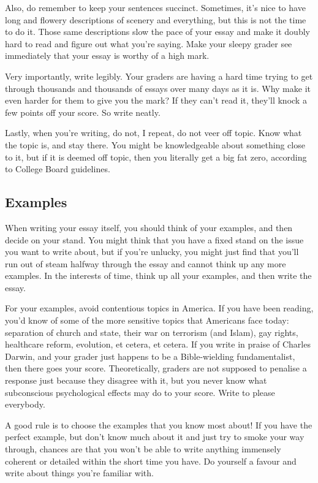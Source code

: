Also, do remember to keep your sentences succinct. Sometimes, it's nice to have long and flowery descriptions of scenery and everything, but this is not the time to do it. Those same descriptions slow the pace of your essay and make it doubly hard to read and figure out what you're saying. Make your sleepy grader see immediately that your essay is worthy of a high mark.

Very importantly, write legibly. Your graders are having a hard time trying to get through thousands and thousands of essays over many days as it is. Why make it even harder for them to give you the mark? If they can't read it, they'll knock a few points off your score. So write neatly.

Lastly, when you're writing, do not, I repeat, do not veer off topic. Know what the topic is, and stay there. You might be knowledgeable about something close to it, but if it is deemed off topic, then you literally get a big fat zero, according to College Board guidelines.
\subsection{Examples}
When writing your essay itself, you should think of your examples, and then decide on your stand. You might think that you have a fixed stand on the issue you want to write about, but if you're unlucky, you might just find that you'll run out of steam halfway through the essay and cannot think up any more examples. In the interests of time, think up all your examples, and then write the essay.

For your examples, avoid contentious topics in America. If you have been reading, you'd know of some of the more sensitive topics that Americans face today: separation of church and state, their war on terrorism (and Islam), gay rights, healthcare reform, evolution, et cetera, et cetera. If you write in praise of Charles Darwin, and your grader just happens to be a Bible-wielding fundamentalist, then there goes your score. Theoretically, graders are not supposed to penalise a response just because they disagree with it, but you never know what subconscious psychological effects may do to your score. Write to please everybody.

A good rule is to choose the examples that you know most about! If you have the perfect example, but don't know much about it and just try to smoke your way through, chances are that you won't be able to write anything immensely coherent or detailed within the short time you have. Do yourself a favour and write about things you're familiar with.

